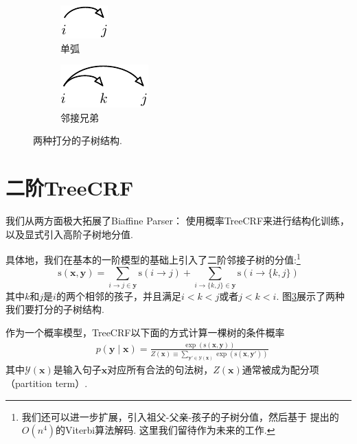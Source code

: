 \begin{figure}[tb]
  \centering
  \begin{subfigure}[b]{0.45\textwidth}
    \centering
    \includegraphics[scale=1.5]{figures/scoring-part/arc.pdf}
    \caption{单弧}
    \label{fig:scoring-part-arc}
  \end{subfigure}
  \begin{subfigure}[b]{0.45\textwidth}
    \centering
    \includegraphics[scale=1.5]{figures/scoring-part/sib.pdf}
    \caption{邻接兄弟}
    \label{fig:scoring-part-sib}
  \end{subfigure}
  \caption{两种打分的子树结构.}
  \label{fig:scoring-part}
\end{figure}

\section{二阶TreeCRF}\label{dep-2o-treecrf}
我们从两方面极大拓展了Biaffine Parser：
使用概率TreeCRF来进行结构化训练，以及显式引入高阶子树地分值.

具体地，我们在基本的一阶模型的基础上引入了二阶邻接子树的分值:\footnote{
  我们还可以进一步扩展，引入祖父-父亲-孩子的子树分值，然后基于 \citep{koo-collins-2010-efficient}提出的$O(n^4)$的Viterbi算法解码.
  这里我们留待作为未来的工作.
}
\begin{equation}\label{eq:dep-2otree-score}
  \mathrm{s}(\boldsymbol{x}, \boldsymbol{y}) = \sum_{i\rightarrow j \in \boldsymbol{y}}\mathrm{s}(i\rightarrow j) + \sum_{
    i\rightarrow \{k,j\} \in \boldsymbol{y}
  } \mathrm{s}(i\rightarrow \{k,j\})
\end{equation}
其中$k$和$j$是$i$的两个相邻的孩子，并且满足$i < k < j$或者$j < k < i$.
图\ref{fig:scoring-part}展示了两种我们要打分的子树结构.

作为一个概率模型，TreeCRF以下面的方式计算一棵树的条件概率
\begin{equation}\label{eq:prob-labeled}
  \begin{split}
    & p(\boldsymbol{y}\mid\boldsymbol{x})  = \frac{\exp(\mathrm{s}(\boldsymbol{x},\boldsymbol{y}))}{Z(\boldsymbol{x}) \equiv \sum_{\boldsymbol{y'} \in \mathcal{Y}(\boldsymbol{x})} {\exp(\mathrm{s}(\boldsymbol{x},\boldsymbol{y'}))}}
  \end{split}
\end{equation}
其中$\mathcal{Y}(\boldsymbol{x})$是输入句子$\boldsymbol{x}$对应所有合法的句法树，$Z(\boldsymbol{x})$通常被成为配分项（partition term）.

